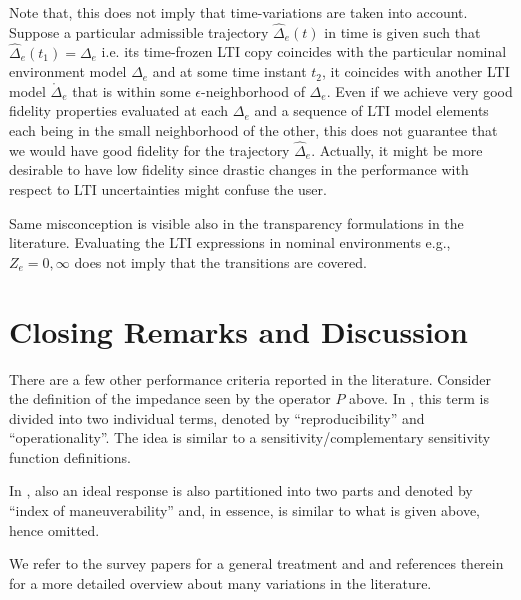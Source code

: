 Note that, this does not imply that time-variations are taken into account. Suppose a particular admissible trajectory
$\hat{\Delta}_e(t)$ in time is given such that $\hat{\Delta}_e(t_1)=\Delta_e$ i.e. its time-frozen LTI copy coincides 
with the particular nominal environment model $\Delta_e$ and at some time instant $t_2$, it  coincides with another 
LTI model $\mathring\Delta_e$ that is within some $\epsilon$-neighborhood of $\Delta_e$. Even if we achieve very good 
fidelity properties evaluated at each $\Delta_e$ and a sequence of LTI model elements each being in the small neighborhood 
of the other, this does not guarantee that we would have good fidelity for the trajectory $\hat{\Delta}_e$. Actually, 
it might be more desirable to have low fidelity since drastic changes in the performance with respect to LTI uncertainties
might confuse the user.

Same misconception is visible also in the transparency formulations in the literature. Evaluating the LTI expressions in 
nominal environments e.g., $Z_e=0,\infty$ does not imply that the transitions are covered.

\section{Closing Remarks and Discussion}
There are a few other performance criteria reported in the literature. Consider the definition of the impedance seen by 
the operator $P$ above. In \cite{iida,katsura}, this term is divided into two individual terms, denoted by 
\enquote{reproducibility} and \enquote{operationality}. The idea is similar to a sensitivity/complementary sensitivity 
function definitions. 

In \cite{yokokohjiyoshikawa}, also an ideal response is also partitioned into two parts and denoted by \enquote{index of 
maneuverability} and, in essence, is similar to what is given above, hence omitted. 

We refer to the survey papers \cite{hokayemspong,passenberg} for a general treatment and \cite{klomp,dennis} and references 
therein for a more detailed overview about many variations in the literature.


